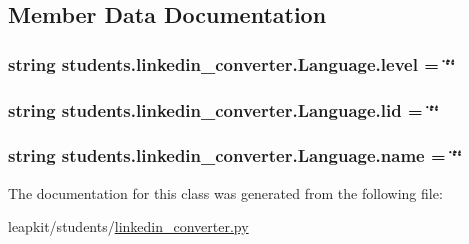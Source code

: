 \subsection{Member Data Documentation}
\hypertarget{classstudents_1_1linkedin__converter_1_1_language_a8f85e43a3425592d3b1b65aae235d098}{
\subsubsection[{level}]{\setlength{\rightskip}{0pt plus 5cm}string students.\-linkedin\-\_\-converter.\-Language.\-level = \char`\"{}\char`\"{}\hspace{0.3cm}{\ttfamily [static]}}}\label{classstudents_1_1linkedin__converter_1_1_language_a8f85e43a3425592d3b1b65aae235d098}
\hypertarget{classstudents_1_1linkedin__converter_1_1_language_a6da003395448aa81cf8c21c7c8d82631}{
\subsubsection[{lid}]{\setlength{\rightskip}{0pt plus 5cm}string students.\-linkedin\-\_\-converter.\-Language.\-lid = \char`\"{}\char`\"{}\hspace{0.3cm}{\ttfamily [static]}}}\label{classstudents_1_1linkedin__converter_1_1_language_a6da003395448aa81cf8c21c7c8d82631}
\hypertarget{classstudents_1_1linkedin__converter_1_1_language_a49e40399b6750244a4ceb0af02735441}{
\subsubsection[{name}]{\setlength{\rightskip}{0pt plus 5cm}string students.\-linkedin\-\_\-converter.\-Language.\-name = \char`\"{}\char`\"{}\hspace{0.3cm}{\ttfamily [static]}}}\label{classstudents_1_1linkedin__converter_1_1_language_a49e40399b6750244a4ceb0af02735441}


The documentation for this class was generated from the following file\-:\begin{DoxyCompactItemize}
\item 
leapkit/students/\hyperlink{linkedin__converter_8py}{linkedin\-\_\-converter.\-py}\end{DoxyCompactItemize}
